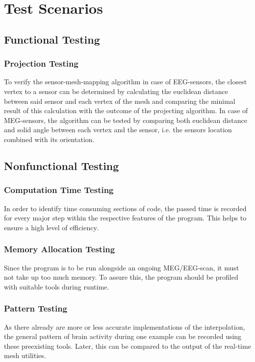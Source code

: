 \section{Test Scenarios}

\subsection{Functional Testing}

\subsubsection{Projection Testing}

To verify the sensor-mesh-mapping algorithm in case of EEG-sensors, the closest vertex to a
sensor can be determined by calculating the euclidean distance between said sensor and each
vertex of the mesh and comparing the minimal result of this calculation with the outcome of
the projecting algorithm. In case of MEG-sensors, the algorithm can be tested by comparing
both euclidean distance and solid angle between each vertex and the sensor, i.e. the sensors
location combined with its orientation.

\subsection{Nonfunctional Testing}

\subsubsection{Computation Time Testing}

In order to identify time consuming sections of code, the passed time is recorded for every
major step within the respective features of the program. This helps to ensure a high level of
efficiency.

\subsubsection{Memory Allocation Testing}

Since the program is to be run alongside an ongoing MEG/EEG-scan, it must not take up
too much memory. To assure this, the program should be profiled with suitable tools during
runtime.

\subsubsection{Pattern Testing}

As there already are more or less accurate implementations of the interpolation, the general
pattern of brain activity during one example can be recorded using these preexisting tools. Later, this can be compared to the output of the real-time mesh utilities.